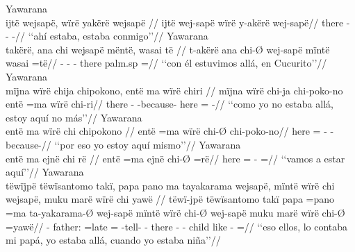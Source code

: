 \documentclass{memoir}
\begin{document}
\pex\label{loc-aff-part-cop-nsubj}    \a Yawarana\\
    \label{convfemgrme-292}        \begingl
        \glpreamble ijtë wejsapë, wïrë yakërë wejsapë //
        \gla ijtë wej-sapë wïrë y-akërë wej-sapë//
        \glb there -  - -//
            \glft ‘‘ahí estaba, estaba conmigo’’//  
        \endgl 
    \a Yawarana\\
    \label{histgrme-17}        \begingl
        \glpreamble takërë, ana chi wejsapë mëntë, wasai të //
        \gla t-akërë ana chi-Ø wej-sapë mïntë wasai =të//
        \glb {}-  - - there palm.sp =//
            \glft ‘‘con él estuvimos allá, en Cucurito’’//  
        \endgl 
    \a Yawarana\\
    \label{convamgu-99}        \begingl
        \glpreamble mïjna wïrë chija chipokono, entë ma wïrë chiri //
        \gla mïjna wïrë chi-ja chi-poko-no entë =ma wïrë chi-ri//
        \glb there  - -because- here =  -//
            \glft ‘‘como yo no estaba allá, estoy aquí no más’’//  
        \endgl 
    \a Yawarana\\
    \label{convamgu-101}        \begingl
        \glpreamble entë ma wïrë chi chipokono //
        \gla entë =ma wïrë chi-Ø chi-poko-no//
        \glb here =  - -because-//
            \glft ‘‘por eso yo estoy aquí mismo’’//  
        \endgl 
    \a Yawarana\\
    \label{convamgu-138}        \begingl
        \glpreamble entë ma ejnë chi rë //
        \gla entë =ma ejnë chi-Ø =rë//
        \glb here =  - =//
            \glft ‘‘vamos a estar aquí’’//  
        \endgl 
    \a Yawarana\\
    \label{convhistfamsjm-92}        \begingl
        \glpreamble tëwïjpë tëwïsantomo takï, papa pano ma tayakarama wejsapë, mïntë wïrë chi wejsapë, muku marë wïrë chi yawë //
        \gla tëwï-jpë tëwïsantomo takï papa =pano =ma ta-yakarama-Ø wej-sapë mïntë wïrë chi-Ø wej-sapë muku marë wïrë chi-Ø =yawë//
        \glb {}-   father: =late = -tell- - there  - - child like  - =//
            \glft ‘‘eso ellos, lo contaba mi papá, yo estaba allá, cuando yo estaba niña’’//  
\end{document}
